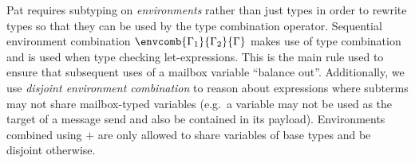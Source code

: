 
Pat requires subtyping on \emph{environments} rather than just types in order to
rewrite types so that they can be used by the type combination operator.
Sequential environment combination $\envcomb{\Gamma_1}{\Gamma_2}{\Gamma}$ makes
use of type combination and is used when type checking let-expressions. This is
the main rule used to ensure that subsequent uses of a mailbox variable
``balance out''.
Additionally, we use \emph{disjoint environment combination} to reason about
expressions where subterms may not share mailbox-typed variables (e.g.\ a
variable may not be used as the target of a message send and also be contained
in its payload). Environments combined using $+$ are only allowed to share
variables of base types and be disjoint otherwise.

